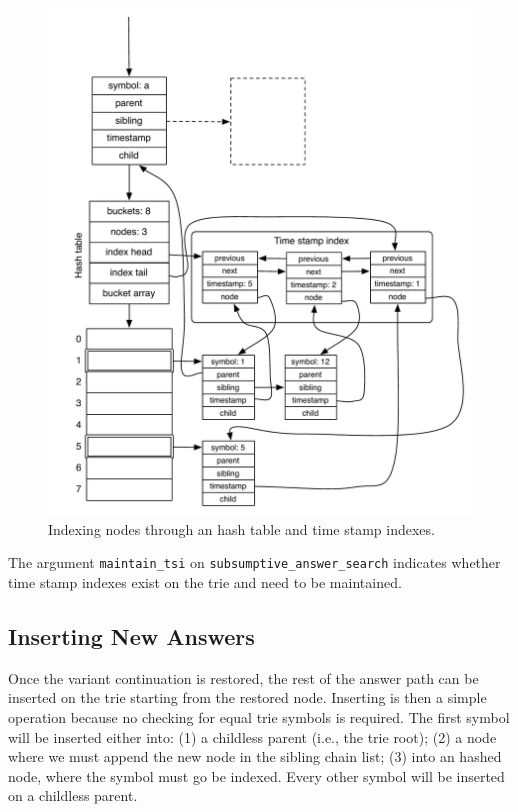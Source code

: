 \begin{figure}[ht]
  \centering
    \includegraphics[scale=0.6]{hash_table_tst.pdf}
  \caption{Indexing nodes through an hash table and time stamp indexes.}
  \label{fig:hash_table_tst}
\end{figure}

The argument \texttt{maintain\_tsi} on \texttt{subsumptive\_answer\_search} indicates whether
time stamp indexes exist on the trie and need to be maintained.

\subsection{Inserting New Answers}

Once the variant continuation is restored, the rest of the answer path can be inserted on the trie starting
from the restored node. Inserting is then a simple operation because no checking for equal trie symbols is required.
The first symbol will be inserted either into: (1) a childless parent (i.e., the trie root); (2) a node where
we must append the new node in the sibling chain list; (3) into an hashed node, where the symbol must go be indexed.
Every other symbol will be inserted on a childless parent.

